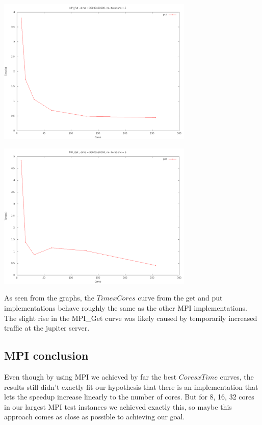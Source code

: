 \documentclass[11pt]{article}
\begin{document}
\begin{center}
\includegraphics[width=0.7\textwidth]{putcxt.png}
\end{center}
\begin{center}
\includegraphics[width=0.7\textwidth]{getcxt.png}
\end{center}

As seen from the graphs, the $Time x Cores$ curve from the get and put implementations behave roughly the same as the other MPI implementations.
The slight rise in the MPI\_Get curve was likely caused by temporarily increased traffic at the jupiter server.
\subsection{MPI conclusion} 
Even though by using MPI we achieved by far the best $Cores x Time$ curves, the results still didn't exactly fit our hypothesis that there is an implementation that
lets the speedup increase linearly to the number of cores. But for 8, 16, 32 cores in our largest MPI test instances we achieved exactly this, so maybe this approach
comes as close as possible to achieving our goal.
\end{document}
